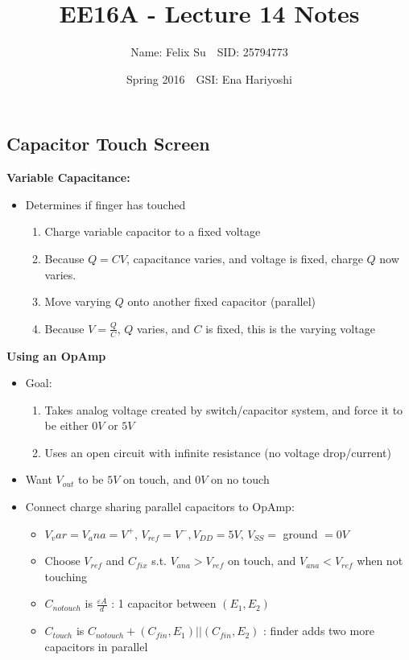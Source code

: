 \documentclass{article}\usepackage{amsmath,amssymb,amsthm,tikz,tkz-graph,color,chngpage,soul,hyperref,csquotes,graphicx,floatrow}\newcommand*{\QEDB}{\hfill\ensuremath{\square}}\newtheorem*{prop}{Proposition}\renewcommand{\theenumi}{\alph{enumi}}\usepackage[shortlabels]{enumitem}\usepackage[nobreak=true]{mdframed}\usetikzlibrary{matrix,calc}\MakeOuterQuote{"}\usepackage[margin=0.75in]{geometry} \newtheorem{theorem}{Theorem}
\title{EE16A - Lecture 14 Notes}
\author{Name: Felix Su$\quad$SID: 25794773}
\date{Spring 2016$\quad$GSI: Ena Hariyoshi}
\begin{document}
\maketitle

\subsection*{Capacitor Touch Screen}
\textbf{Variable Capacitance:}
\begin{itemize}
    \item Determines if finger has touched
    \begin{enumerate}
        \item Charge variable capacitor to a fixed voltage
        \item Because $Q = CV$, capacitance varies, and voltage is fixed, charge $Q$ now varies.
        \item Move varying $Q$ onto another fixed capacitor (parallel)
        \item Because $V = \frac{Q}{C}$, $Q$ varies, and $C$ is fixed, this is the varying voltage
    \end{enumerate}
\end{itemize}
\textbf{Using an OpAmp}
\begin{itemize}
    \item Goal:
    \begin{enumerate}
        \item Takes analog voltage created by switch/capacitor system, and force it to be either $0V$ or $5V$
        \item Uses an open circuit with infinite resistance (no voltage drop/current)
    \end{enumerate}
    \item Want $V_{out}$ to be $5V$ on touch, and $0V$ on no touch
    \item Connect charge sharing parallel capacitors to OpAmp:
    \begin{itemize}
        \item $V_var = V_ana = V^+$, $V_{ref} = V^-, V_{DD} = 5V$, $V_{SS} =$ ground $= 0V$
        \item Choose $V_{ref}$ and $C_{fix}$ s.t. $V_{ana} > V_{ref}$ on touch, and $V_{ana} < V_{ref}$ when not touching
        \item $C_{notouch}$ is $\frac{\varepsilon A}{d}$ : 1 capacitor between $(E_1, E_2)$
        \item $C_{touch}$ is $C_{notouch} + (C_{fin}, E_1)||(C_{fin}, E_2)$ : finder adds two more capacitors in parallel
    \end{itemize}
\end{itemize}
\end{document}
